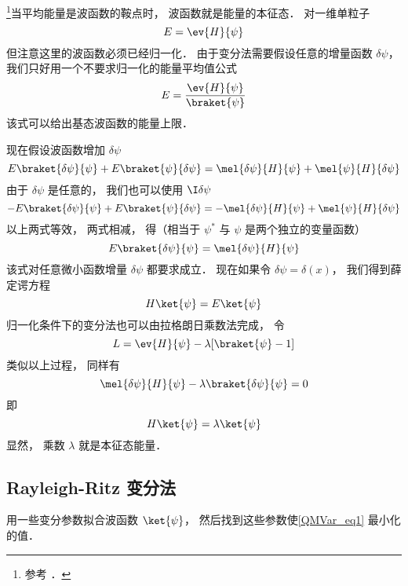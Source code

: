 
\footnote{参考 \cite{Brandsen}．}当平均能量是波函数的鞍点时， 波函数就是能量的本征态． 对一维单粒子
\begin{equation}
E = \ev{H}{\psi}
\end{equation}
但注意这里的波函数必须已经归一化． 由于变分法需要假设任意的增量函数 $\delta \psi $，  我们只好用一个不要求归一化的能量平均值公式
\begin{equation}\label{QMVar_eq1}
E = \frac{\ev{H}{\psi}}{\braket{\psi}}
\end{equation}
该式可以给出基态波函数的能量上限．

现在假设波函数增加 $\delta \psi$ 
\begin{equation}
E \braket{\delta\psi}{\psi} + E\braket{\psi}{\delta\psi}
= \mel{\delta \psi}{H}{\psi} + \mel{\psi}{H}{\delta\psi}
\end{equation}
由于 $\delta\psi$ 是任意的， 我们也可以使用 $\I\delta\psi$ 
\begin{equation}
-E \braket{\delta\psi}{\psi} + E \braket{\psi}{\delta\psi}
= -\mel{\delta\psi}{H}{\psi} + \mel{\psi}{H}{\delta\psi}
\end{equation}
以上两式等效， 两式相减， 得（相当于 $\psi^*$ 与 $\psi$ 是两个独立的变量函数）
\begin{equation}
E\braket{\delta\psi}{\psi} = \mel{\delta\psi}{H}{\psi}
\end{equation}
该式对任意微小函数增量 $\delta\psi $ 都要求成立． 现在如果令 $\delta \psi  = \delta (x)$，  我们得到薛定谔方程
\begin{equation}
H \ket{\psi} = E\ket{\psi}
\end{equation}
归一化条件下的变分法也可以由拉格朗日乘数法完成， 令
\begin{equation}
L = \ev{H}{\psi} - \lambda [\braket{\psi} - 1]
\end{equation}
类似以上过程， 同样有
\begin{equation}
\mel{\delta\psi}{H}{\psi} - \lambda\braket{\delta\psi}{\psi} = 0
\end{equation}
即
\begin{equation}
H \ket{\psi} = \lambda \ket{\psi}
\end{equation}
显然， 乘数 $\lambda $ 就是本征态能量．

\subsection{Rayleigh-Ritz 变分法}
用一些变分参数拟合波函数 $\ket{\psi}$， 然后找到这些参数使\autoref{QMVar_eq1} 最小化的值．


